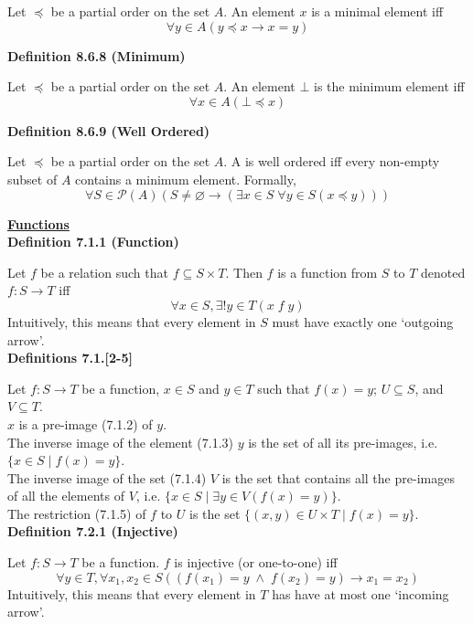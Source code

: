 \documentclass[a4paper]{article}
\newcommand{\heading}[1]{{\small\underline{\textbf{#1}}}}
\newcommand{\subheading}[1]{{\scriptsize\textbf{#1}}}
\begin{document}
\begin{multicols*}{4}
Let $\preceq$ be a partial order on the set $A$. An element $x$ is a minimal
element iff $$\forall y \in A (y \preceq x \rightarrow x = y)$$

\subheading{Definition 8.6.8 (Minimum)}

Let $\preceq$ be a partial order on the set $A$. An element $\bot$ is the
minimum element iff $$\forall x \in A (\bot \preceq x)$$

\subheading{Definition 8.6.9 (Well Ordered)}

Let $\preceq$ be a partial order on the set $A$. A is well ordered iff every
non-empty subset of $A$ contains a minimum element. Formally,
$$\forall S \in \mathcal{P}(A) (S \neq \varnothing \rightarrow
  (\exists x \in S\;\forall y \in S(x \preceq y)))$$

\heading{Functions} \\

\subheading{Definition 7.1.1 (Function)}

Let $f$ be a relation such that $f \subseteq S \times T$. Then $f$ is a function
from $S$ to $T$ denoted $f: S\rightarrow T$ iff
$$\forall x \in S, \exists! y \in T(x\;f\;y)$$
Intuitively, this means that every element in $S$ must have exactly one
`outgoing arrow'.\\

\subheading{Definitions 7.1.[2-5]}

Let $f : S \rightarrow T$ be a function, $x \in S$ and $y \in T$ such that
$f(x)=y$; $U \subseteq S$, and $V \subseteq T$.\\

$x$ is a pre-image (7.1.2) of $y$.\\

The inverse image of the element (7.1.3) $y$ is the set of all its pre-images,
i.e. $\{x \in S\;|\;f(x) = y\}$.\\

The inverse image of the set (7.1.4) $V$ is the set that contains all the
pre-images of all the elements of $V$, i.e.
$\{x \in S\;|\;\exists y \in V (f(x) = y)\}$.\\

The restriction (7.1.5) of $f$ to $U$ is the set
$\{(x, y) \in U \times T\;|\;f(x)=y\}$.\\

\subheading{Definition 7.2.1 (Injective)}

Let $f : S \rightarrow T$ be a function. $f$ is injective (or one-to-one) iff
$$\forall y \in T, \forall x_1, x_2 \in S (
  (f(x_1) = y\;\land\;f(x_2) = y) \rightarrow x_1 = x_2)$$
Intuitively, this means that every element in $T$ has have at most one `incoming
arrow'.\\


\end{multicols*}
\end{document}
